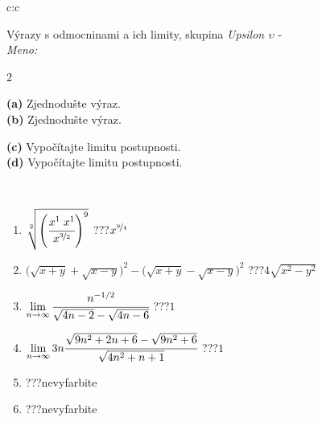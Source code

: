 \documentclass[10pt]{report}
\begin{document}
\begin{tabular}{c:c}
\begin{minipage}[c][104.5mm][t]{0.5\linewidth}
\begin{center}
\vspace{7mm}
{\huge {\Large Výrazy s odmocninami a ich limity}, skupina \textit{Upsilon $\upsilon$} -}\\[5mm]
\textit{Meno:}\phantom{xxxxxxxxxxxxxxxxxxxxxxxxxxxxxxxxxxxxxxxxxxxxxxxxxxxxxxxxxxxxxxxxx}\\[5mm]
\begin{minipage}{0.95\linewidth}
\begin{center}
{\small \begin{multicols}{2} \raggedright
\phantom{xxxxxxxxx}\textbf{(a)} Zjednodušte výraz. \\[1mm]
\phantom{xxxxxxxxx}\textbf{(b)} Zjednodušte výraz. \par \columnbreak
\textbf{(c)} Vypočítajte limitu postupnosti. \\[1mm]
\textbf{(d)} Vypočítajte limitu postupnosti.
\end{multicols}
}
\end{center}
\end{minipage}
\\[4mm]
\begin{minipage}{0.79\linewidth}
\begin{center}
\begin{varwidth}{\linewidth}
\begin{enumerate}
\small
\item $\sqrt[2]{\left(\cfrac{x^{1}\;x^{1}}{x^{\nicefrac{3}{2}}}\right)^{9}}$\quad \dotfill\; ???\;\dotfill \quad $x^{\nicefrac{9}{4}}$
\item {\footnotesize{\scriptsize$\big(\sqrt{x+y}+\sqrt{x-y}\big)^2-\big(\sqrt{x+y}-\sqrt{x-y}\big)^2$}\quad \dotfill\; ???\;\dotfill \quad $4\sqrt{x^2-y^2}$}
\item $\lim\limits_{n\to\infty}\cfrac{n^{-1/2}}{\sqrt{4n-2}-\sqrt{4n-6}}$\quad \dotfill\; ???\;\dotfill \quad $1$
\item $\lim\limits_{n\to\infty}3n\cfrac{\sqrt{9n^2+2n+6}-\sqrt{9n^2+6}}{\sqrt{4n^2+n+1}}$\quad \dotfill\; ???\;\dotfill \quad $1$
\item \quad \dotfill\; ???\;\dotfill \quad nevyfarbite
\item \quad \dotfill\; ???\;\dotfill \quad nevyfarbite
\end{enumerate}
\end{varwidth}
\end{center}

\end{minipage}
\end{center}
\end{minipage}
\end{tabular}
\end{document}
